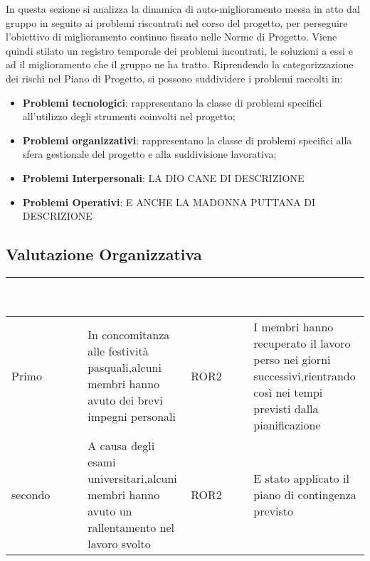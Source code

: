 In questa sezione si analizza la dinamica di auto-miglioramento messa in atto dal gruppo in seguito ai problemi riscontrati nel corso del progetto, per perseguire l'obiettivo di miglioramento continuo fissato nelle Norme di Progetto. Viene quindi stilato un registro temporale dei problemi incontrati, le soluzioni a essi e ad il miglioramento che il gruppo ne ha tratto.
Riprendendo la categorizzazione dei rischi nel Piano di Progetto, si possono suddividere i problemi raccolti in:

\begin{itemize}
	\item \textbf{Problemi tecnologici}: rappresentano la classe di problemi specifici all'utilizzo degli strumenti coinvolti nel progetto;
	\item \textbf{Problemi organizzativi}: rappresentano la classe di problemi specifici alla sfera gestionale del progetto e alla suddivisione lavorativa;
	\item \textbf{Problemi Interpersonali}: LA DIO CANE DI DESCRIZIONE
	\item \textbf{Problemi Operativi}: E ANCHE LA MADONNA PUTTANA DI DESCRIZIONE
\end{itemize}

\subsection{Valutazione Organizzativa}
{
    \setlength{\freewidth}{\dimexpr\textwidth-10\tabcolsep}
    \renewcommand{\arraystretch}{1.5}
    \centering
    \setlength{\aboverulesep}{0pt}
    \setlength{\belowrulesep}{0pt}
    \begin{longtable}{C{.25\freewidth} C{.257\freewidth} C{.16\freewidth} C{.4\freewidth}}
       \toprule
    \textcolor{white}{\textbf{Incremento}}&
    \textcolor{white}{\textbf{Problema emerso}}&
    \textcolor{white}{\textbf{Rischio associato}}&
    \textcolor{white}{\textbf{Soluzione migliorativa}}\\	
    \toprule
    \endhead
    
   Primo & In concomitanza alle festività pasquali,alcuni membri hanno avuto dei brevi impegni personali & ROR2 &I membri hanno recuperato il lavoro perso nei giorni successivi,rientrando così nei tempi previsti dalla pianificazione \\

   secondo & A causa degli esami universitari,alcuni membri hanno avuto un rallentamento nel lavoro svolto & ROR2 & E stato applicato il piano di contingenza
   previsto \\
   
   \bottomrule
   \end{longtable}
}


